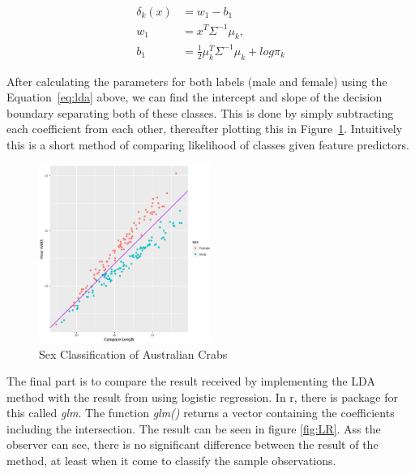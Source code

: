 \documentclass[a4paper, twocolumn]{article}
\begin{document}
        \begin{equation} \label{eq:lda}
          \begin{split}
            \delta_k(x) &=  w_1 - b_1 \\
            w_1 &= x^{T}\Sigma^{-1}\mu_k, \\
            b_1 &= \frac{1}{2}\mu_k^{T}\Sigma^{-1}\mu_k+log\pi_k
          \end{split}
        \end{equation}

        After calculating the parameters for both labels (male and female) using the Equation~\ref{eq:lda} above, we can find the intercept and slope of the decision boundary
        separating both of these classes. This is done by simply subtracting each coefficient from each other, thereafter plotting this in Figure~\ref{fig:boundary}. Intuitively this
        is a short method of comparing likelihood of classes given feature predictors.     

        \begin{figure}
          \centering
          \caption{Sex Classification of Australian Crabs}
          \label{fig:boundary}
          \includegraphics[width=0.5\textwidth]{share/boundary.eps}
        \end{figure}
       The final part is to compare the result received by implementing the LDA method with the result from using logistic regression. In r, there is package for this called \textit{glm}. 
	   The function \textit{glm()} returns a vector containing the coefficients including the intersection. The result can be seen in figure \ref{fig:LR}. Ass the observer can see, there 
	   is no significant difference between the result of the method, at least when it come to classify the sample observations. 
\end{document}

